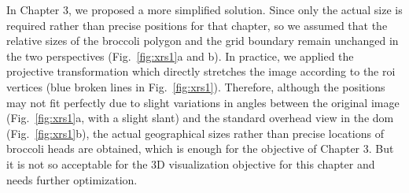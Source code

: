 In Chapter 3, we proposed a more simplified solution. Since only the actual size is required rather than precise positions for that chapter, so we assumed that the relative sizes of the broccoli polygon and the grid boundary remain unchanged in the two perspectives (Fig.~\ref{fig:xrs1}a and b). In practice, we applied the projective transformation which directly stretches the image according to the \gls{roi} vertices (blue broken lines in Fig.~\ref{fig:xrs1}). Therefore, although the positions may not fit perfectly due to slight variations in angles between the original image (Fig.~\ref{fig:xrs1}a, with a slight slant) and the standard overhead view in the \gls{dom} (Fig.~\ref{fig:xrs1}b), the actual geographical sizes rather than precise locations of broccoli heads are obtained, which is enough for the objective of Chapter 3. But it is not so acceptable for the 3D visualization objective for this chapter and needs further optimization.



